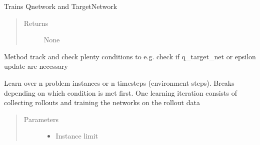 \documentclass[letterpaper,10pt,english]{sphinxmanual}
\begin{document}
\begin{fulllineitems}
\begin{fulllineitems}
\label{\detokenize{agents.reinforcement_learning:agents.reinforcement_learning.dqn.DQN.train}}
\sphinxAtStartPar
Trains Q\sphinxhyphen{}network and Target\sphinxhyphen{}Network
\begin{quote}\begin{description}
\item[{Returns}] \leavevmode
\sphinxAtStartPar
None

\end{description}\end{quote}

\end{fulllineitems}


\begin{fulllineitems}
\label{\detokenize{agents.reinforcement_learning:agents.reinforcement_learning.dqn.DQN.on_step}}
\sphinxAtStartPar
Method track and check plenty conditions to e.g. check if q\_target\_net or epsilon update are necessary

\end{fulllineitems}


\begin{fulllineitems}
\label{\detokenize{agents.reinforcement_learning:agents.reinforcement_learning.dqn.DQN.learn}}
\sphinxAtStartPar
Learn over n problem instances or n timesteps (environment steps).
Breaks depending on which condition is met first.
One learning iteration consists of collecting rollouts and training the networks on the rollout data
\begin{quote}\begin{description}
\item[{Parameters}] \leavevmode\begin{itemize}
\item {} 
\sphinxAtStartPar
{} \textendash{} Instance limit


\end{itemize}
\end{description}
\end{quote}
\end{fulllineitems}
\end{fulllineitems}
\end{document}
